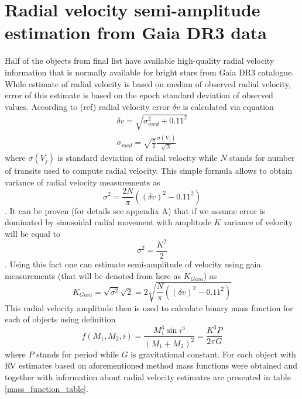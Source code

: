 \documentclass{pracalicmgr}
\begin{document}
\section{Radial velocity semi-amplitude estimation from Gaia DR3 data}
Half of the objects from final list have available high-quality radial velocity information that is normally available for bright stars from Gaia DR3 catalogue. While estimate of radial velocity 
is based on median of observed radial velocity, error of this estimate is based on the epoch standard deviation of observed values. According to (ref) radial velocity error $\delta v$ 
is calculated via equation
\begin{align}
    \delta v=\sqrt{\sigma_{med}^2+0.11^2}\\
    \sigma_{med}=\sqrt{\frac{\pi}{2}}\frac{\sigma(V_j)}{\sqrt{N}}
\end{align}
where $\sigma(V_j)$ is standard deviation of radial velocity while $N$ stands for number of transits used to compute radial velocity. This simple formula allows to obtain variance of 
radial velocity measurements as 
\begin{equation}
    \sigma^2=\frac{2N}{\pi}\left((\delta v)^2-0.11^2\right)
\end{equation}
. It can be proven (for details see appendix A) that if we assume error is dominated by sinusoidal radial movement with amplitude $K$ 
variance of velocity will be equal to
\begin{equation}
    \sigma^2=\frac{K^2}{2}
\end{equation}.
Using this fact one can estimate semi-amplitude of velocity using gaia measurements (that will be denoted from here as $K_{Gaia}$) as 
\begin{equation}
    K_{Gaia}=\sqrt{\sigma^2}\sqrt{2}=2\sqrt{\frac{N}{\pi}\left((\delta v)^2-0.11^2\right)}
\end{equation}
This radial velocity amplitude then is used to calculate binary mass function for each of objects using definition 
\begin{equation}
    f(M_1,M_2,i)=\frac{M_1^3 \sin{i}^3}{(M_1+M_2)^2}=\frac{K^3 P}{2\pi G}
\end{equation}
where $P$ stands for period while $G$ is gravitational constant. For each object with RV estimates based on aforementioned method mass functions were obtained and together with
information about radial velocity estimates are presented in table \ref{mass_function_table}.
\end{document}
